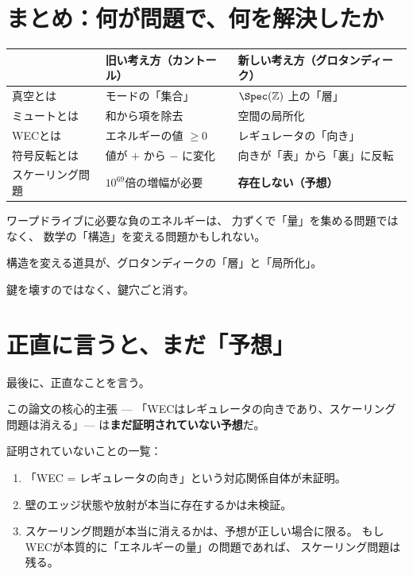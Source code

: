 \documentclass[12pt,a4paper]{article}
\begin{document}
\section{まとめ：何が問題で、何を解決したか}

\begin{table}[h]
\centering
\renewcommand{\arraystretch}{1.5}
\begin{tabular}{p{3cm}p{5cm}p{5cm}}
\toprule
& \textbf{旧い考え方}（カントール） & \textbf{新しい考え方}（グロタンディーク） \\
\midrule
真空とは & モードの「集合」 & $\Spec(\mathbb{Z})$ 上の「層」 \\
ミュートとは & 和から項を除去 & 空間の局所化 \\
WECとは & エネルギーの値 $\geq 0$ & レギュレータの「向き」 \\
符号反転とは & 値が $+$ から $-$ に変化 & 向きが「表」から「裏」に反転 \\
スケーリング問題 & $10^{69}$倍の増幅が必要 & \textbf{存在しない（予想）} \\
\bottomrule
\end{tabular}
\end{table}

\begin{keybox}[この論文の一言まとめ]
ワープドライブに必要な負のエネルギーは、
力ずくで「量」を集める問題ではなく、
数学の「構造」を変える問題かもしれない。

構造を変える道具が、グロタンディークの「層」と「局所化」。

鍵を壊すのではなく、鍵穴ごと消す。
\end{keybox}

\section{正直に言うと、まだ「予想」}

最後に、正直なことを言う。

この論文の核心的主張 ---
「WECはレギュレータの向きであり、スケーリング問題は消える」---
は\textbf{まだ証明されていない予想}だ。

証明されていないことの一覧：

\begin{enumerate}
\item 「WEC = レギュレータの向き」という対応関係自体が未証明。
\item 壁のエッジ状態や放射が本当に存在するかは未検証。
\item スケーリング問題が本当に消えるかは、予想が正しい場合に限る。
  もしWECが本質的に「エネルギーの量」の問題であれば、
  スケーリング問題は残る。
\end{enumerate}
\end{document}
